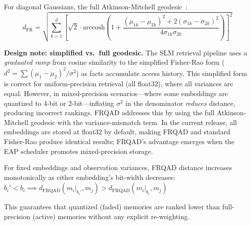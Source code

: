 For diagonal Gaussians, the full Atkinson-Mitchell geodesic~\cite{atkinson-mitchell}:
\begin{equation}
d_{\text{FR}} = \sqrt{\sum_{k=1}^{d} \left[\sqrt{2} \cdot \text{arccosh}\left(1 + \frac{(\mu_{1k} - \mu_{2k})^2 + 2(\sigma_{1k} - \sigma_{2k})^2}{4\sigma_{1k}\sigma_{2k}}\right)\right]^2}
\end{equation}

\textbf{Design note: simplified vs.\ full geodesic.} The SLM retrieval pipeline uses a \emph{graduated ramp} from cosine similarity to the simplified Fisher-Rao form ($d^2 = \sum(\mu_1 - \mu_2)^2/\sigma^2$) as facts accumulate access history. This simplified form is correct for uniform-precision retrieval (all float32), where all variances are equal. However, in mixed-precision scenarios---where some embeddings are quantized to 4-bit or 2-bit---inflating $\sigma^2$ in the denominator \emph{reduces} distance, producing incorrect rankings. FRQAD addresses this by using the full Atkinson-Mitchell geodesic with the variance-mismatch term. In the current release, all embeddings are stored at float32 by default, making FRQAD and standard Fisher-Rao produce identical results; FRQAD's advantage emerges when the EAP scheduler promotes mixed-precision storage.

\begin{proposition}
For fixed embeddings and observation variances, FRQAD distance increases monotonically as either embedding's bit-width decreases:
$b_i' < b_i \implies d_{\text{FRQAD}}(m_i|_{b_i'}, m_j) > d_{\text{FRQAD}}(m_i|_{b_i}, m_j)$
\end{proposition}

This guarantees that quantized (faded) memories are ranked lower than full-precision (active) memories without any explicit re-weighting.

